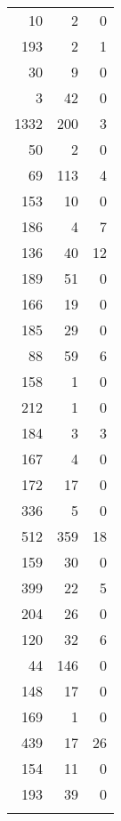 \documentclass[letterpaper,11pt]{article}
\begin{document}
\begin{longtable}{rrr}
   10 &   2 &   0 \\ 
  193 &   2 &   1 \\ 
   30 &   9 &   0 \\ 
    3 &  42 &   0 \\ 
  1332 & 200 &   3 \\ 
   50 &   2 &   0 \\ 
   69 & 113 &   4 \\ 
  153 &  10 &   0 \\ 
  186 &   4 &   7 \\ 
  136 &  40 &  12 \\ 
  189 &  51 &   0 \\ 
  166 &  19 &   0 \\ 
  185 &  29 &   0 \\ 
   88 &  59 &   6 \\ 
  158 &   1 &   0 \\ 
  212 &   1 &   0 \\ 
  184 &   3 &   3 \\ 
  167 &   4 &   0 \\ 
  172 &  17 &   0 \\ 
  336 &   5 &   0 \\ 
  512 & 359 &  18 \\ 
  159 &  30 &   0 \\ 
  399 &  22 &   5 \\ 
  204 &  26 &   0 \\ 
  120 &  32 &   6 \\ 
   44 & 146 &   0 \\ 
  148 &  17 &   0 \\ 
  169 &   1 &   0 \\ 
  439 &  17 &  26 \\ 
  154 &  11 &   0 \\ 
  193 &  39 &   0 \\ 
   \hline
\hline
\label{ppxtab}
\end{longtable}
\end{document}
